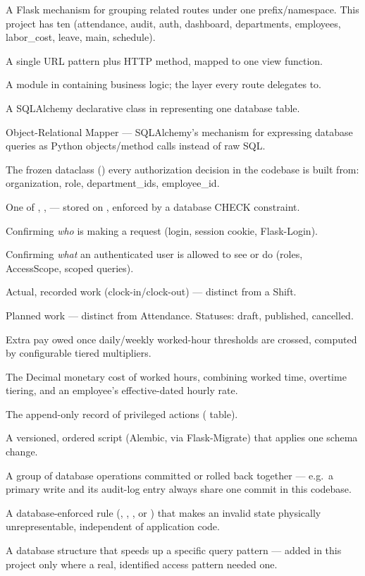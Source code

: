 \begin{description}[style=nextline,leftmargin=1em]
\item[Blueprint] A Flask mechanism for grouping related routes under
  one prefix/namespace. This project has ten (attendance, audit, auth,
  dashboard, departments, employees, labor\_cost, leave, main,
  schedule).
\item[Route] A single URL pattern plus HTTP method, mapped to one view
  function.
\item[Service] A module in  containing business
  logic; the layer every route delegates to.
\item[Model] A SQLAlchemy declarative class in 
  representing one database table.
\item[ORM] Object-Relational Mapper --- SQLAlchemy's mechanism for
  expressing database queries as Python objects/method calls instead of
  raw SQL.
\item[AccessScope] The frozen dataclass () every
  authorization decision in the codebase is built from: organization,
  role, department\_ids, employee\_id.
\item[Role] One of , ,  ---
  stored on , enforced by a database CHECK constraint.
\item[Authentication] Confirming \emph{who} is making a request
  (login, session cookie, Flask-Login).
\item[Authorization] Confirming \emph{what} an authenticated user is
  allowed to see or do (roles, AccessScope, scoped queries).
\item[Attendance] Actual, recorded work (clock-in/clock-out) --- distinct
  from a Shift.
\item[Shift] Planned work --- distinct from Attendance. Statuses:
  draft, published, cancelled.
\item[Overtime] Extra pay owed once daily/weekly worked-hour thresholds
  are crossed, computed by configurable tiered multipliers.
\item[Labor Cost] The Decimal monetary cost of worked hours, combining
  worked time, overtime tiering, and an employee's effective-dated
  hourly rate.
\item[Audit Log] The append-only record of privileged actions
  ( table).
\item[Migration] A versioned, ordered script (Alembic, via
  Flask-Migrate) that applies one schema change.
\item[Transaction] A group of database operations committed or rolled
  back together --- e.g.\ a primary write and its audit-log entry
  always share one commit in this codebase.
\item[Constraint] A database-enforced rule (,
  , , or ) that makes an
  invalid state physically unrepresentable, independent of application
  code.
\item[Index] A database structure that speeds up a specific query
  pattern --- added in this project only where a real, identified
  access pattern needed one.
\end{description}

